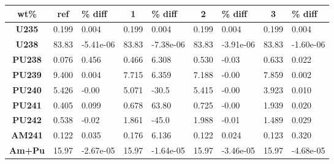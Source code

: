 	\begin{tabular}{c|ca|ca|ca|ca}
		\hline
		\textbf{wt\%} & \textbf{ref}  & \textbf{\% diff} & \textbf{1} & \textbf{\% diff} & \textbf{2} & \textbf{\% diff} & \textbf{3} & \textbf{\% diff}\\ 
		\hline
		\textbf{U235} & 0.199 & 0.004 & 0.199 & 0.004 & 0.199 & 0.004 & 0.199 & 0.004 \\ 
		\textbf{U238} & 83.83 & -5.41e-06 & 83.83 & -7.38e-06 & 83.83 & -3.91e-06 & 83.83 & -1.60e-06 \\ 
		\textbf{PU238} & 0.076 & 0.456 & 0.466 & 6.308 & 0.530 & -0.03 & 0.633 & 0.022 \\ 
		\textbf{PU239} & 9.400 & 0.004 & 7.715 & 6.359 & 7.188 & -0.00 & 7.859 & 0.002 \\ 
		\textbf{PU240} & 5.426 & -0.00 & 5.071 & -30.5 & 5.415 & -0.00 & 3.923 & 0.010 \\ 
		\textbf{PU241} & 0.405 & 0.099 & 0.678 & 63.80 & 0.725 & -0.00 & 1.939 & 0.020 \\ 
		\textbf{PU242} & 0.538 & -0.02 & 1.861 & -45.0 & 1.988 & -0.01 & 1.489 & 0.029 \\ 
		\textbf{AM241} & 0.122 & 0.035 & 0.176 & 6.136 & 0.122 & 0.024 & 0.123 & 0.320 \\ 
		\hline
		\hline
		\textbf{Am+Pu} & 15.97 & -2.67e-05 & 15.97 & -1.64e-05 & 15.97 & -3.46e-05 & 15.97 & -4.68e-05 \\ 
		\hline 
	\end{tabular} 
